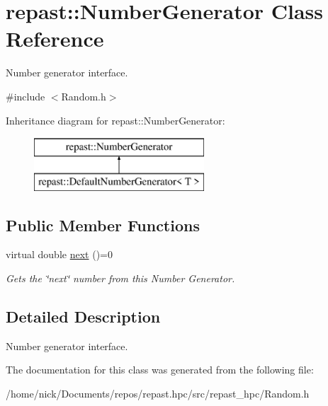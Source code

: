 \hypertarget{classrepast_1_1_number_generator}{\section{repast\-:\-:Number\-Generator Class Reference}
\label{classrepast_1_1_number_generator}
}


Number generator interface.  




{\ttfamily \#include $<$Random.\-h$>$}

Inheritance diagram for repast\-:\-:Number\-Generator\-:\begin{figure}[H]
\begin{center}
\leavevmode
\includegraphics[height=2.000000cm]{classrepast_1_1_number_generator}
\end{center}
\end{figure}
\subsection*{Public Member Functions}
\begin{DoxyCompactItemize}
\item 
\hypertarget{classrepast_1_1_number_generator_a98d94cf82a5283ff29d0df69b1b2f67c}{virtual double \hyperlink{classrepast_1_1_number_generator_a98d94cf82a5283ff29d0df69b1b2f67c}{next} ()=0}\label{classrepast_1_1_number_generator_a98d94cf82a5283ff29d0df69b1b2f67c}

\begin{DoxyCompactList}\small\item\em Gets the \char`\"{}next\char`\"{} number from this Number Generator. \end{DoxyCompactList}\end{DoxyCompactItemize}


\subsection{Detailed Description}
Number generator interface. 

The documentation for this class was generated from the following file\-:\begin{DoxyCompactItemize}
\item 
/home/nick/\-Documents/repos/repast.\-hpc/src/repast\-\_\-hpc/Random.\-h\end{DoxyCompactItemize}
